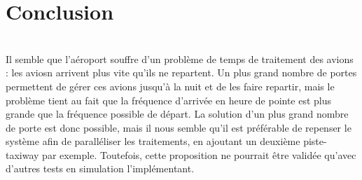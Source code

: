 \chapter{Conclusion}\\
Il semble que l'aéroport souffre d'un problème de temps de traitement des avions : les aviosn arrivent plus vite qu'ils ne repartent. Un plus grand nombre de portes permettent de gérer ces avions jusqu'à la nuit et de les faire repartir, mais le problème tient au fait que la fréquence d'arrivée en heure de pointe est plus grande que la fréquence possible de départ.
La solution d'un plus grand nombre de porte est donc possible, mais il nous semble qu'il est préférable de repenser le système afin de paralléliser les traitements, en ajoutant un deuxième piste-taxiway par exemple. Toutefois, cette proposition ne pourrait être validée qu'avec d'autres tests en simulation l'implémentant.


